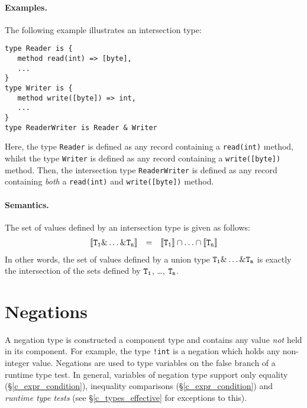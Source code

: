 \paragraph{Examples.}  The following example illustrates an intersection type:

\begin{lstlisting}
type Reader is { 
   method read(int) => [byte],
   ...
}
type Writer is { 
   method write([byte]) => int,
   ...
}
type ReaderWriter is Reader & Writer
\end{lstlisting}
Here, the type \lstinline{Reader} is defined as any record containing a \lstinline{read(int)} method, whilst the type \lstinline{Writer} is defined as any record containing a \lstinline{write([byte])} method.  Then, the intersection type \lstinline{ReaderWriter} is defined as any record containing {\em both} a \lstinline{read(int)} and \lstinline{write([byte])} method.

\paragraph{Semantics.}  The set of values defined by an intersection type is given as follows:
\begin{displaymath}
\begin{array}{rcl}
{\tt\llbracket T_1\&\ldots\&T_n\rrbracket} & = & {\tt \llbracket T_1\rrbracket\cap\ldots\cap \llbracket T_n\rrbracket}\\
\end{array}
\end{displaymath}
In other words, the set of values defined by a union type ${\tt T_1\&\ldots\&T_n}$ is exactly the intersection of the sets defined by ${\tt T_1}$, \ldots, ${\tt T_n}$.


\section{Negations}
\label{c_types_negations}

A negation type is constructed a component type and contains any value {\em not} held in its component.  For example, the type \lstinline{!int} is a negation which holds any non-integer value.  Negations are used to type variables on the false branch of a runtime type test.  In general, variables of negation type support only equality (\S\ref{c_expr_condition}), inequality comparisons (\S\ref{c_expr_condition}) and {\em runtime type tests} (see \S\ref{c_types_effective} for exceptions to this).

